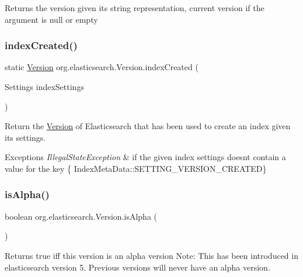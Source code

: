 Returns the version given its string representation, current version if the argument is null or empty \hypertarget{classorg_1_1elasticsearch_1_1_version_a6c61e82b33e6a02aeea43e0d5db810df}{}\label{classorg_1_1elasticsearch_1_1_version_a6c61e82b33e6a02aeea43e0d5db810df} 
\subsubsection{\texorpdfstring{index\+Created()}{indexCreated()}}
{\footnotesize\ttfamily static \hyperlink{classorg_1_1elasticsearch_1_1_version}{Version} org.\+elasticsearch.\+Version.\+index\+Created (\begin{DoxyParamCaption}\item[{Settings}]{index\+Settings }\end{DoxyParamCaption})\hspace{0.3cm}{\ttfamily [static]}}

Return the \hyperlink{classorg_1_1elasticsearch_1_1_version}{Version} of Elasticsearch that has been used to create an index given its settings.


\begin{DoxyExceptions}{Exceptions}
{\em Illegal\+State\+Exception} & if the given index settings doesn\textquotesingle{}t contain a value for the key \{ Index\+Meta\+Data\+::\+S\+E\+T\+T\+I\+N\+G\+\_\+\+V\+E\+R\+S\+I\+O\+N\+\_\+\+C\+R\+E\+A\+T\+ED\} \\
\hline
\end{DoxyExceptions}
\hypertarget{classorg_1_1elasticsearch_1_1_version_a560e0d9bdd52a687b6920df72199dbec}{}\label{classorg_1_1elasticsearch_1_1_version_a560e0d9bdd52a687b6920df72199dbec} 
\subsubsection{\texorpdfstring{is\+Alpha()}{isAlpha()}}
{\footnotesize\ttfamily boolean org.\+elasticsearch.\+Version.\+is\+Alpha (\begin{DoxyParamCaption}{ }\end{DoxyParamCaption})}

Returns true iff this version is an alpha version Note\+: This has been introduced in elasticsearch version 5. Previous versions will never have an alpha version. \hypertarget{classorg_1_1elasticsearch_1_1_version_af19fa9cd6c365d9b6f1ab0003463e259}{}\label{classorg_1_1elasticsearch_1_1_version_af19fa9cd6c365d9b6f1ab0003463e259} 
